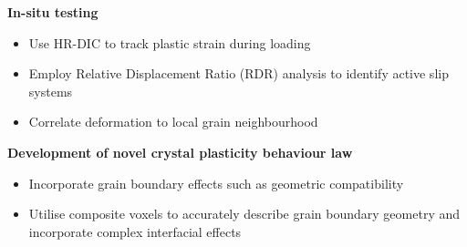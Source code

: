 \textbf{In-situ testing}
\begin{itemize}
    \item Use HR-DIC to track plastic strain during loading
    \item Employ Relative Displacement Ratio (RDR) analysis to identify active slip systems
    \item Correlate deformation to local grain neighbourhood
\end{itemize}

\textbf{Development of novel crystal plasticity behaviour law}
\begin{itemize}
    \item Incorporate grain boundary effects such as geometric compatibility
    \item Utilise composite voxels to accurately describe grain boundary geometry and incorporate complex interfacial effects
\end{itemize}